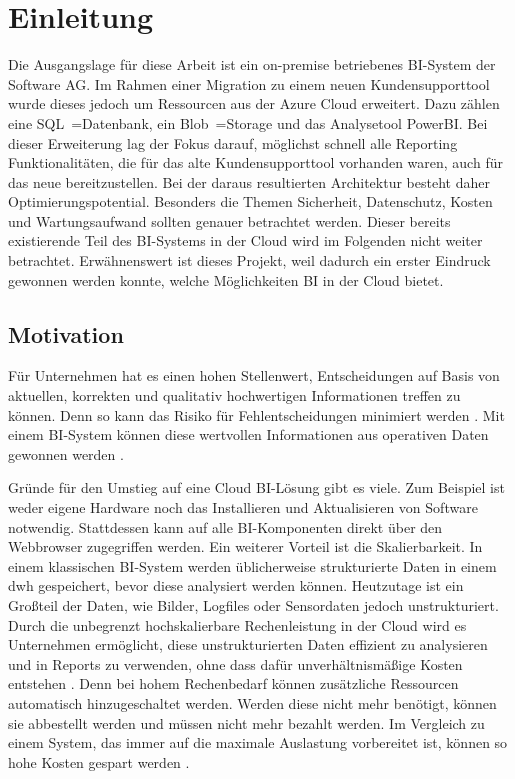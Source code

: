 \chapter{Einleitung} \label{ch:intro}
Die Ausgangslage für diese Arbeit ist ein on-premise betriebenes BI-System der Software AG. Im Rahmen einer Migration zu einem neuen Kundensupporttool wurde dieses jedoch um Ressourcen aus der Azure Cloud erweitert. Dazu zählen eine SQL~=Datenbank, ein Blob~=Storage und das Analysetool PowerBI. Bei dieser Erweiterung lag der Fokus darauf, möglichst schnell alle Reporting Funktionalitäten, die für das alte Kundensupporttool vorhanden waren, auch für das neue bereitzustellen. Bei der daraus resultierten Architektur besteht daher Optimierungspotential. Besonders die Themen Sicherheit, Datenschutz, Kosten und Wartungsaufwand sollten genauer betrachtet werden. Dieser bereits existierende Teil des BI-Systems in der Cloud wird im Folgenden nicht weiter betrachtet. Erwähnenswert ist dieses Projekt, weil dadurch ein erster Eindruck gewonnen werden konnte, welche Möglichkeiten BI in der Cloud bietet.

\section{Motivation} \label{sec:intro:motivation}
Für Unternehmen hat es einen hohen Stellenwert, Entscheidungen auf Basis von aktuellen, korrekten und qualitativ hochwertigen Informationen treffen zu können. Denn so kann das Risiko für Fehlentscheidungen minimiert werden \cite{grunwald_business_2009}. Mit einem BI-System können diese wertvollen Informationen aus operativen Daten gewonnen werden \cite{muller_business_2013}.

Gründe für den Umstieg auf eine Cloud BI-Lösung gibt es viele. Zum Beispiel ist weder eigene Hardware noch das Installieren und Aktualisieren von Software notwendig. Stattdessen kann auf alle BI-Komponenten direkt über den Webbrowser zugegriffen werden. Ein weiterer Vorteil ist die Skalierbarkeit. In einem klassischen BI-System werden üblicherweise strukturierte Daten in einem \ac{dwh} gespeichert, bevor diese analysiert werden können. Heutzutage ist ein Großteil der Daten, wie Bilder, Logfiles oder Sensordaten jedoch unstrukturiert. Durch die unbegrenzt hochskalierbare Rechenleistung in der Cloud wird es Unternehmen ermöglicht, diese unstrukturierten Daten effizient zu analysieren und in Reports zu verwenden, ohne dass dafür unverhältnismäßige Kosten entstehen \cite{gurjar_cloud_2013}. Denn bei hohem Rechenbedarf können zusätzliche Ressourcen automatisch hinzugeschaltet werden. Werden diese nicht mehr benötigt, können sie abbestellt werden und müssen nicht mehr bezahlt werden. Im Vergleich zu einem System, das immer auf die maximale Auslastung vorbereitet ist, können so hohe Kosten gespart werden \cite{ouf_cloud_2011}.


